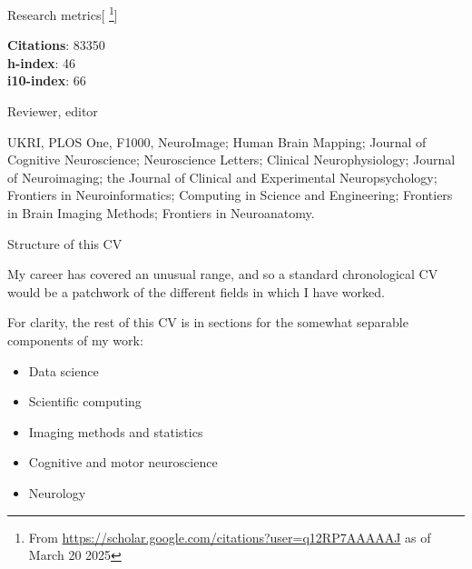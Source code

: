 \documentclass{cv}
\begin{document}
\begin{cvSection}{Research metrics}[
    \footnote{ From
    \url{https://scholar.google.com/citations?user=q12RP7AAAAAJ} as of March 20 2025}]

{\bf Citations}: 83350 \\
{\bf h-index}: 46 \\
{\bf i10-index}: 66

\end{cvSection}

\begin{cvSection}{Reviewer, editor}

    UKRI, PLOS One, F1000, NeuroImage; Human Brain Mapping; Journal of Cognitive
    Neuroscience; Neuroscience Letters; Clinical Neurophysiology; Journal of
    Neuroimaging; the Journal of Clinical and Experimental Neuropsychology;
    Frontiers in Neuroinformatics; Computing in Science and Engineering;
    Frontiers in Brain Imaging Methods; Frontiers in Neuroanatomy.

\end{cvSection}

\begin{cvSection}{Structure of this CV}

        My career has covered an unusual range, and so a standard chronological
        CV would be a patchwork of the different fields in which I have worked.

        For clarity, the rest of this CV is in sections for the somewhat
        separable components of my work:

        \begin{itemize}
            \item Data science
            \item Scientific computing
            \item Imaging methods and statistics
            \item Cognitive and motor neuroscience
            \item Neurology
        \end{itemize}

\end{cvSection}
\end{document}
